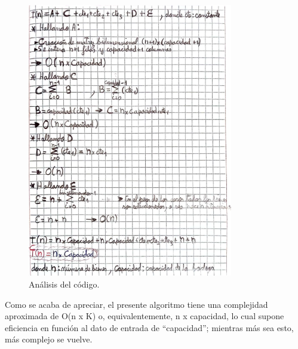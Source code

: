 \begin{figure}[H]
    \centering
    \includegraphics[width=0.8\textwidth]{complejidad_mochila_ejem2_2.png}
    \caption{Análisis del código.}
    \label{fig:complejidad_ejemplo2_2}
\end{figure}

Como se acaba de apreciar, el presente algoritmo tiene una complejidad aproximada de O(n x K) o, equivalentemente, n x capacidad, lo cual supone eficiencia en función al dato de entrada de “capacidad”; mientras más sea esto, más complejo se vuelve.

